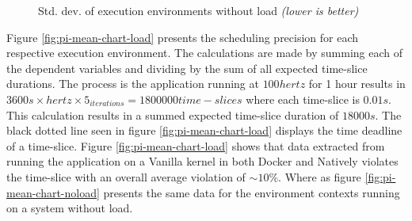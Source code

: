 \mydatanoload
\begin{figure}[ht]
\caption{Std. dev. of execution environments without load \textit{(lower is better)}}
\label{fig:pi-std-chart-noload}
\end{figure}




Figure \ref{fig:pi-mean-chart-load} presents the scheduling precision for each respective execution environment. The calculations are made by summing each of the dependent variables and dividing by the sum of all expected time-slice durations. The process is the application running at $100 hertz$ for 1 hour results in $3600s \times hertz \times 5_{iterations}=1 800 000 time-slices$ where each time-slice is $0.01s$. This calculation results in a summed expected time-slice duration of $18000s$. The black dotted line seen in figure \ref{fig:pi-mean-chart-load} displays the time deadline of a time-slice. Figure \ref{fig:pi-mean-chart-load} shows that data extracted from running the application on a Vanilla kernel in both Docker and Natively violates the time-slice with an overall average violation of $\sim10\%$. Where as figure \ref{fig:pi-mean-chart-noload} presents the same data for the environment contexts running on a system without load.




